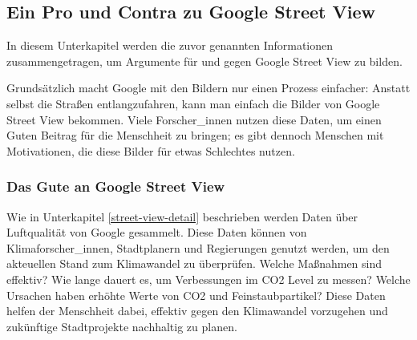 
\subsection{Ein Pro und Contra zu Google Street View}

In diesem Unterkapitel werden die zuvor genannten Informationen
zusammengetragen, um Argumente für und gegen Google Street View zu bilden.

Grundsätzlich macht Google mit den Bildern nur einen Prozess einfacher: Anstatt
selbst die Straßen entlangzufahren, kann man einfach die Bilder von Google
Street View bekommen. Viele Forscher\_innen nutzen diese Daten, um einen Guten
Beitrag für die Menschheit zu bringen; es gibt dennoch Menschen mit
Motivationen, die diese Bilder für etwas Schlechtes nutzen.



\subsubsection{Das Gute an Google Street View}

Wie in Unterkapitel \ref{street-view-detail} beschrieben werden Daten über
Luftqualität von Google gesammelt. Diese Daten können von Klimaforscher\_innen,
Stadtplanern und Regierungen genutzt werden, um den akteuellen Stand zum
Klimawandel zu überprüfen. Welche Maßnahmen sind effektiv? Wie lange dauert es,
um Verbessungen im CO2 Level zu messen? Welche Ursachen haben erhöhte Werte von
CO2 und Feinstaubpartikel?
Diese Daten helfen der Menschheit dabei, effektiv gegen den Klimawandel
vorzugehen und zukünftige Stadtprojekte nachhaltig zu planen.

